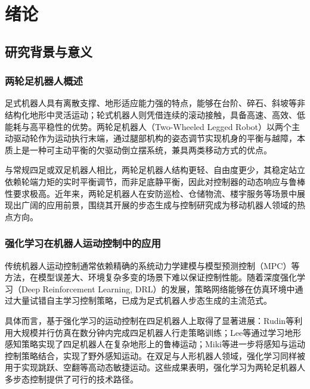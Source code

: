 
\chapter[绪论]{绪论}
\label{cha:intro}

\section{研究背景与意义}

\subsection{两轮足机器人概述}

足式机器人具有离散支撑、地形适应能力强的特点，能够在台阶、碎石、斜坡等非结构化地形中灵活运动\cite{raibert1986}；轮式机器人则凭借连续的滚动接触，具备高速、高效、低能耗与高平稳性的优势\cite{klemm2019}。两轮足机器人（Two-Wheeled Legged Robot）以两个主动驱动轮作为运动执行末端，通过腿部机构的姿态调节实现机身的平衡与越障，本质上是一种可主动平衡的欠驱动倒立摆系统，兼具两类移动方式的优点。

与常规四足或双足机器人相比，两轮足机器人结构更轻、自由度更少，其稳定站立依赖轮端力矩的实时平衡调节，而非足底静平衡，因此对控制器的动态响应与鲁棒性要求极高\cite{raibert1986}。近年来，两轮足机器人在安防巡检、仓储物流、楼宇服务等场景中展现出广阔的应用前景，围绕其开展的步态生成与控制研究成为移动机器人领域的热点方向。

\subsection{强化学习在机器人运动控制中的应用}

传统机器人运动控制通常依赖精确的系统动力学建模与模型预测控制（MPC）等方法，在模型误差大、环境复杂多变的场景下难以保证控制性能。随着深度强化学习（Deep Reinforcement Learning, DRL）的发展，策略网络能够在仿真环境中通过大量试错自主学习控制策略，已成为足式机器人步态生成的主流范式\cite{kober2013,hwangbo2019}。

具体而言，基于强化学习的运动控制在四足机器人上取得了显著进展：Rudin等\cite{rudin2022}利用大规模并行仿真在数分钟内完成四足机器人行走策略训练；Lee等\cite{lee2020}通过学习地形感知策略实现了四足机器人在复杂地形上的鲁棒运动；Miki等\cite{miki2022}进一步将感知与运动控制策略结合，实现了野外感知运动。在双足与人形机器人领域，强化学习同样被用于实现跳跃、空翻等高动态敏捷运动\cite{margolis2022,cheng2024}。这些成果表明，强化学习为两轮足机器人多步态控制提供了可行的技术路径。

